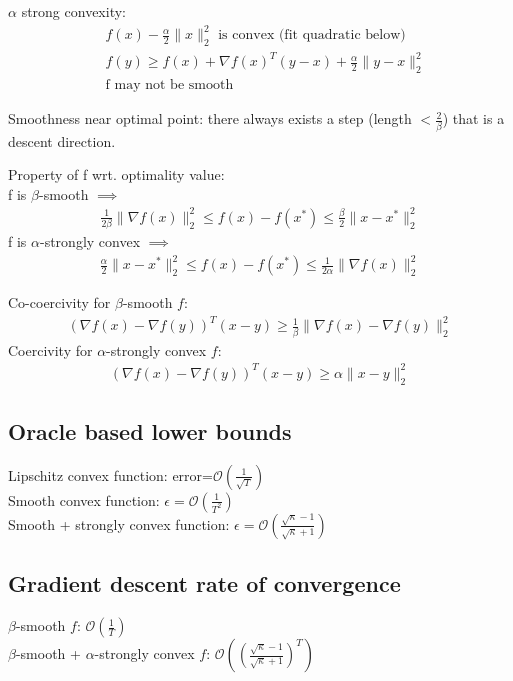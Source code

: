 \documentclass[8pt,letter]{article}
\begin{document}
\begin{multicols*}{2}
    $\alpha$ strong convexity:
    \begin{align*}
      & f(x) - \frac{\alpha}{2} \|x\|_2^2 \text{ is convex (fit quadratic below)}\\
      & f(y) \geq f(x) + \nabla f(x)^T (y-x) + \frac{\alpha}{2} \|y-x\|_2^2\\
      & \text{f may not be smooth}
    \end{align*}

    Smoothness near optimal point: there always exists a step (length $<\frac{2}{\beta}$) that is a descent direction.

    Property of f wrt. optimality value:\\
    f is $\beta$-smooth $\implies$
    \begin{align*}
      \frac{1}{2 \beta} \|\nabla f(x) \|_2^2 \leq f(x) -f(x^*) \leq \frac{\beta}{2} \| x-x^* \|_2^2
    \end{align*}
    f is $\alpha$-strongly convex $\implies$
    \begin{align*}
      \frac{\alpha}{2} \| x-x^* \|_2^2 \leq f(x) -f(x^*) \leq \frac{1}{2 \alpha} \|\nabla f(x) \|_2^2
    \end{align*}

    Co-coercivity for $\beta$-smooth $f$:
    \begin{align*}
      \left(\nabla f(x) - \nabla f(y)\right)^T(x-y) \geq \frac{1}{\beta} \|\nabla f(x) - \nabla f(y)\|_2^2
    \end{align*}
    Coercivity for $\alpha$-strongly convex $f$:
    \begin{align*}
      \left(\nabla f(x) - \nabla f(y)\right)^T(x-y) \geq \alpha \|x - y\|_2^2
    \end{align*}
    
    \subsection {Oracle based lower bounds}
    Lipschitz convex function: error=$\mathcal{O}(\frac{1}{\sqrt{T}})$\\
    Smooth convex function: $\epsilon=\mathcal{O}(\frac{1}{T^2})$\\
    Smooth + strongly convex function: $\epsilon=\mathcal{O}(\frac{\sqrt{\kappa}-1}{\sqrt{\kappa}+1})$

    \subsection {Gradient descent rate of convergence}
    $\beta$-smooth $f$: $\mathcal{O}(\frac{1}{T})$\\
    $\beta$-smooth + $\alpha$-strongly convex $f$: $\mathcal{O}((\frac{\sqrt{\kappa}-1}{\sqrt{\kappa}+1})^T)$


\end{multicols*}
\end{document}
